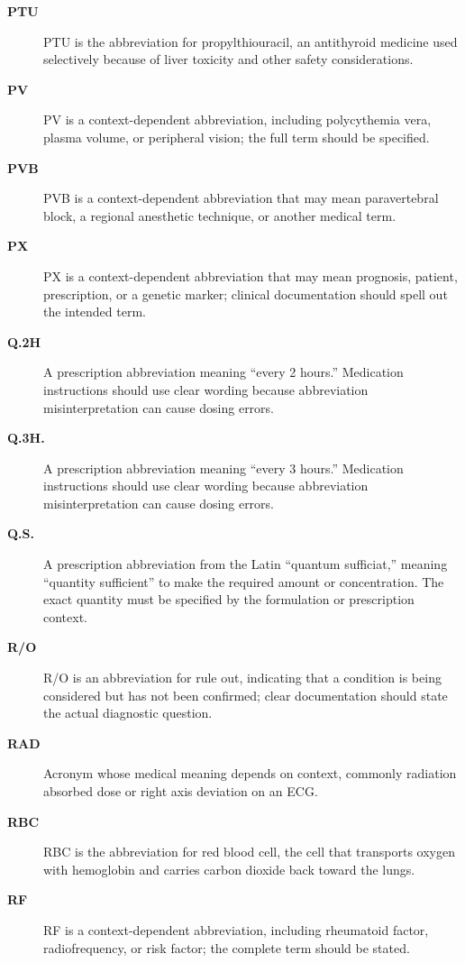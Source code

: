 \begin{description}
\item[\textbf{PTU}] PTU is the abbreviation for propylthiouracil, an antithyroid medicine used selectively because of liver toxicity and other safety considerations.

\item[\textbf{PV}] PV is a context-dependent abbreviation, including polycythemia vera, plasma volume, or peripheral vision; the full term should be specified.

\item[\textbf{PVB}] PVB is a context-dependent abbreviation that may mean paravertebral block, a regional anesthetic technique, or another medical term.

\item[\textbf{PX}] PX is a context-dependent abbreviation that may mean prognosis, patient, prescription, or a genetic marker; clinical documentation should spell out the intended term.

\item[\textbf{Q.2H}] A prescription abbreviation meaning “every 2 hours.” Medication instructions should use clear wording because abbreviation misinterpretation can cause dosing errors.

\item[\textbf{Q.3H.}] A prescription abbreviation meaning “every 3 hours.” Medication instructions should use clear wording because abbreviation misinterpretation can cause dosing errors.

\item[\textbf{Q.S.}] A prescription abbreviation from the Latin “quantum sufficiat,” meaning “quantity sufficient” to make the required amount or concentration. The exact quantity must be specified by the formulation or prescription context.

\item[\textbf{R/O}] R/O is an abbreviation for rule out, indicating that a condition is being considered but has not been confirmed; clear documentation should state the actual diagnostic question.

\item[\textbf{RAD}] Acronym whose medical meaning depends on context, commonly radiation absorbed dose or right axis deviation on an ECG.

\item[\textbf{RBC}] RBC is the abbreviation for red blood cell, the cell that transports oxygen with hemoglobin and carries carbon dioxide back toward the lungs.

\item[\textbf{RF}] RF is a context-dependent abbreviation, including rheumatoid factor, radiofrequency, or risk factor; the complete term should be stated.


\end{description}

